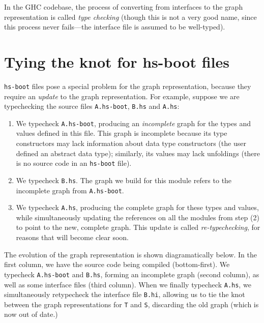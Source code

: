 In the GHC codebase, the process of converting from interfaces to
the graph representation is called \emph{type checking} (though this
is not a very good name, since this process never fails---the
interface file is assumed to be well-typed).

\section{Tying the knot for hs-boot files}
\label{sec:boot}

\verb|hs-boot| files pose a special problem for the graph
representation, because they require an \emph{update} to the
graph representation.  For example, suppose we are typechecking
the source files \verb|A.hs-boot|, \verb|B.hs| and \verb|A.hs|:

\begin{enumerate}
    \item We typecheck \verb|A.hs-boot|, producing an \emph{incomplete}
    graph for the types and values defined in this
    file.  This graph is incomplete because its type
    constructors may lack information about data type constructors (the
    user defined an abstract data type); similarly, its values may lack
    unfoldings (there is no source code in an \verb|hs-boot| file).

    \item We typecheck \verb|B.hs|.  The graph we build for this module
    refers to the incomplete graph from \verb|A.hs-boot|.

    \item We typecheck \verb|A.hs|, producing the complete graph
    for these types and values, while simultaneously
    updating the references on all the modules from step (2) to point
    to the new, complete graph. This update is called
    \emph{re-typechecking}, for reasons that will become clear soon.
\end{enumerate}

\noindent
The evolution of the graph representation is shown diagramatically below.
In the first column, we have the source code being compiled (bottom-first).
We typecheck \verb|A.hs-boot| and \verb|B.hs|, forming an incomplete graph
(second column), as well as some interface files (third column).
When we finally typecheck \verb|A.hs|, we simultaneously retypecheck
the interface file \verb|B.hi|, allowing us to tie the knot between the
graph representations for \verb|T| and \verb|S|, discarding the old
graph (which is now out of date.)

